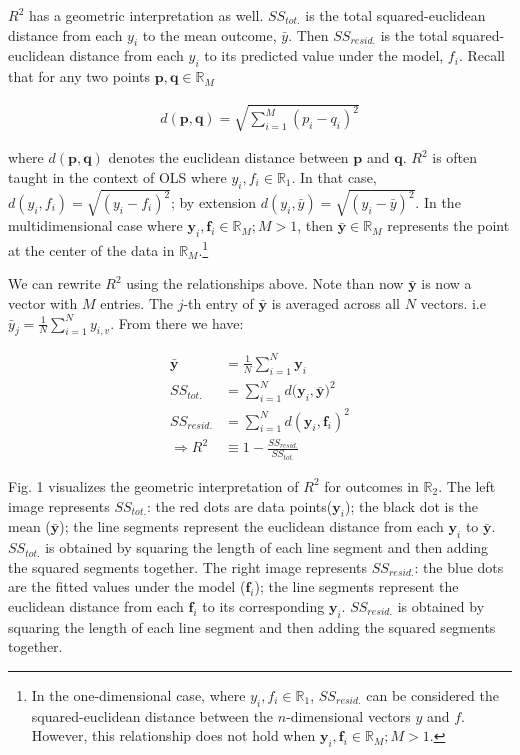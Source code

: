 \documentclass[conference,final,]{IEEEtran}
\begin{document}
\(R^2\) has a geometric interpretation as well. \(SS_{tot.}\) is the
total squared-euclidean distance from each \(y_i\) to the mean outcome,
\(\bar{y}\). Then \(SS_{resid.}\) is the total squared-euclidean
distance from each \(y_i\) to its predicted value under the model,
\(f_i\). Recall that for any two points
\(\mathbf{p}, \mathbf{q} \in \mathbb{R}_M\)

\begin{align}
    d(\mathbf{p},\mathbf{q}) = \sqrt{\sum_{i=1}^M{(p_i - q_i)^2}}
\end{align}

where \(d(\mathbf{p}, \mathbf{q})\) denotes the euclidean distance
between \(\mathbf{p}\) and \(\mathbf{q}\). \(R^2\) is often taught in
the context of OLS where \(y_i, f_i \in \mathbb{R}_1\). In that case,
\(d(y_i, f_i) = \sqrt{(y_i - f_i)^2}\); by extension
\(d(y_i, \bar{y}) = \sqrt{(y_i - \bar{y})^2}\). In the multidimensional
case where \(\mathbf{y}_i, \mathbf{f}_i \in \mathbb{R}_M; M > 1\), then
\(\bar{\mathbf{y}} \in \mathbb{R}_M\) represents the point at the center
of the data in \(\mathbb{R}_M\).\footnote{In the one-dimensional case,
  where \(y_i , f_i \in \mathbb{R}_1\), \(SS_{resid.}\) can be
  considered the squared-euclidean distance between the
  \(n\)-dimensional vectors \(y\) and \(f\). However, this relationship
  does not hold when
  \(\mathbf{y}_i , \mathbf{f}_i \in \mathbb{R}_M ; M > 1\).}

We can rewrite \(R^2\) using the relationships above. Note than now
\(\bar{\mathbf{y}}\) is now a vector with \(M\) entries. The \(j\)-th
entry of \(\bar{\mathbf{y}}\) is averaged across all \(N\) vectors. i.e
\(\bar{y}_j = \frac{1}{N} \sum_{i=1}^{N} y_{i,v}\). From there we have:

\begin{align}
    \bar{\mathbf{y}} &= \frac{1}{N} \sum_{i=1}^{N} \mathbf{y}_i \\ 
    SS_{tot.} &= \sum_{i=1}^N{d(\mathbf{y}_i, \bar{\mathbf{y}}})^2\\
    SS_{resid.} &= \sum_{i=1}^N{d(\mathbf{y}_i, \mathbf{f}_i)^2}\\
    \Rightarrow R^2 & \equiv 1 - \frac{SS_{resid.}}{SS_{tot.}}
\end{align}

Fig. 1 visualizes the geometric interpretation of \(R^2\) for outcomes
in \(\mathbb{R}_2\). The left image represents \(SS_{tot.}\): the red
dots are data points(\(\mathbf{y}_i\)); the black dot is the mean
(\(\bar{\mathbf{y}}\)); the line segments represent the euclidean
distance from each \(\mathbf{y}_i\) to \(\bar{\mathbf{y}}\).
\(SS_{tot.}\) is obtained by squaring the length of each line segment
and then adding the squared segments together. The right image
represents \(SS_{resid.}\): the blue dots are the fitted values under
the model (\(\mathbf{f}_i\)); the line segments represent the euclidean
distance from each \(\mathbf{f}_i\) to its corresponding
\(\mathbf{y}_i\). \(SS_{resid.}\) is obtained by squaring the length of
each line segment and then adding the squared segments together.
\end{document}

